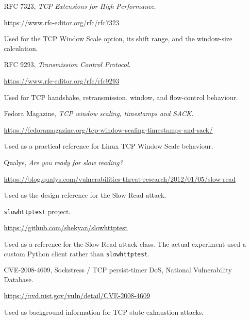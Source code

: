 \documentclass[11pt]{article}
\begin{document}
\begin{enumerate}[label={[\arabic*]}]

    \item RFC 7323, \emph{TCP Extensions for High Performance}.

    \url{https://www.rfc-editor.org/rfc/rfc7323}

    Used for the TCP Window Scale option, its shift range, and the
    window-size calculation.

    \item RFC 9293, \emph{Transmission Control Protocol}.

    \url{https://www.rfc-editor.org/rfc/rfc9293}

    Used for TCP handshake, retransmission, window, and flow-control
    behaviour.

    \item Fedora Magazine, \emph{TCP window scaling, timestamps and SACK}.

    \url{https://fedoramagazine.org/tcp-window-scaling-timestamps-and-sack/}

    Used as a practical reference for Linux TCP Window Scale behaviour.

    \item Qualys, \emph{Are you ready for slow reading?}

    \url{https://blog.qualys.com/vulnerabilities-threat-research/2012/01/05/slow-read}

    Used as the design reference for the Slow Read attack.

    \item \texttt{slowhttptest} project.

    \url{https://github.com/shekyan/slowhttptest}

    Used as a reference for the Slow Read attack class. The actual
    experiment used a custom Python client rather than
    \texttt{slowhttptest}.

    \item CVE-2008-4609, Sockstress / TCP persist-timer DoS,
    National Vulnerability Database.

    \url{https://nvd.nist.gov/vuln/detail/CVE-2008-4609}

    Used as background information for TCP state-exhaustion attacks.

\end{enumerate}
\end{document}
